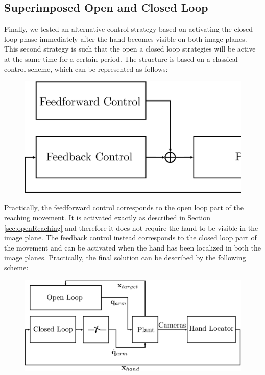 \subsection{Superimposed Open and Closed Loop}

Finally, we tested an alternative control strategy based on activating the closed loop 
phase immediately after the hand becomes visible on both image planes. This second strategy
is such that the open a closed loop strategies will be active at the same time for a 
certain period. The structure is based on a classical control scheme, which can be represented as follows:

\begin{figure}[th!]
\begin{center}
\includegraphics[scale = 0.25]{Figure/OpenVSClosedLoop.eps}
\end{center}
\end{figure}

Practically, the feedforward control corresponds to the open loop part of the reaching movement.
It is activated exactly as described in Section \ref{sec:openReaching} and therefore it does not
require the hand to be visible in the image plane. The feedback control
instead corresponds to the closed loop part of the movement and can be activated when the hand
has been localized in both the image planes. Practically, the final solution can be described by the 
following scheme:

\begin{figure}[th!]
\begin{center}
\includegraphics[scale = 0.25]{Figure/OpenVSClosedLoopSwitch.eps}
\end{center}
\end{figure}


